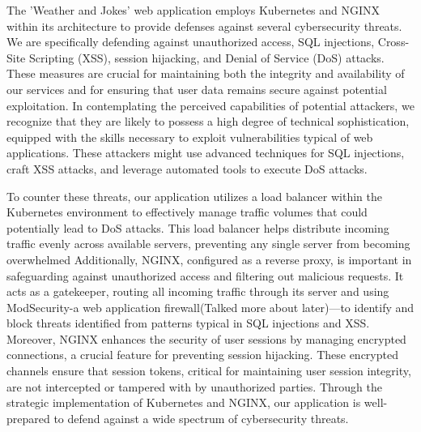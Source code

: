 The 'Weather and Jokes' web application employs Kubernetes and NGINX within its architecture to provide defenses against several cybersecurity threats. 
We are specifically defending against unauthorized access, SQL injections, Cross-Site Scripting (XSS), session hijacking, and Denial of Service (DoS) attacks. 
These measures are crucial for maintaining both the integrity and availability of our services and for ensuring that user data remains secure against potential exploitation.
In contemplating the perceived capabilities of potential attackers, we recognize that they are likely to possess a high degree of technical sophistication, equipped with the skills necessary to exploit vulnerabilities typical of web applications. 
These attackers might use advanced techniques for SQL injections, craft XSS attacks, and leverage automated tools to execute DoS attacks.

To counter these threats, our application utilizes a load balancer within the Kubernetes environment to effectively manage traffic volumes that could potentially lead to DoS attacks. 
This load balancer helps distribute incoming traffic evenly across available servers, preventing any single server from becoming overwhelmed
Additionally, NGINX, configured as a reverse proxy, is important in safeguarding against unauthorized access and filtering out malicious requests. It acts as a gatekeeper, routing all incoming traffic through its server and using ModSecurity-a web application firewall(Talked more about later)—to identify and block threats identified from patterns typical in SQL injections and XSS. 
Moreover, NGINX enhances the security of user sessions by managing encrypted connections, a crucial feature for preventing session hijacking. 
These encrypted channels ensure that session tokens, critical for maintaining user session integrity, are not intercepted or tampered with by unauthorized parties.
Through the strategic implementation of Kubernetes and NGINX, our application is well-prepared to defend against a wide spectrum of cybersecurity threats.
